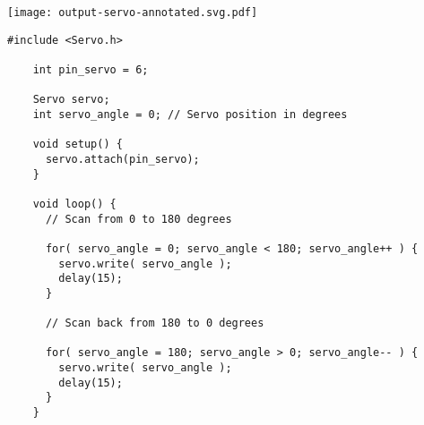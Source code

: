 \vspace{0.1in}
\begin{minipage}[t]{0.49\tw}
  \vspace{0.0in}
  \texttt{[image: output-servo-annotated.svg.pdf]}
\end{minipage}
\hspace{0.1in}
\begin{minipage}[t]{0.49\tw}
  \vspace{0.1in}
  \begin{Verbatim}[gobble=3,fontsize=\small]
    #include <Servo.h>

    int pin_servo = 6;

    Servo servo;
    int servo_angle = 0; // Servo position in degrees

    void setup() {
      servo.attach(pin_servo);
    }

    void loop() {
      // Scan from 0 to 180 degrees

      for( servo_angle = 0; servo_angle < 180; servo_angle++ ) {
        servo.write( servo_angle );
        delay(15);
      }

      // Scan back from 180 to 0 degrees

      for( servo_angle = 180; servo_angle > 0; servo_angle-- ) {
        servo.write( servo_angle );
        delay(15);
      }
    }
  \end{Verbatim}
\end{minipage}
\vspace{0.1in}

